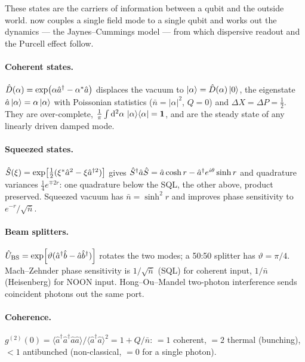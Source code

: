 These states are the carriers of information between a qubit and the
outside world.  now couples a single field
mode to a single qubit and works out the dynamics --- the
Jaynes--Cummings model --- from which dispersive readout and the
Purcell effect follow.

\clearpage
\begin{chaptersummary}

\paragraph{Coherent states.}
$\hat{D}(\alpha)=\exp(\alpha\hat a^\dagger-\alpha^*\hat a)$ displaces
the vacuum to $\ket\alpha=\hat{D}(\alpha)\ket0$, the eigenstate
$\hat a\ket\alpha=\alpha\ket\alpha$ with Poissonian statistics
($\bar n=|\alpha|^2$, $Q=0$) and $\Delta X=\Delta P=\tfrac12$. They
are over-complete, $\tfrac1\pi\int\dd^2\alpha\,\ket\alpha\!\bra\alpha=\mathbf{1}$,
and are the steady state of any linearly driven damped mode.

\paragraph{Squeezed states.}
$\hat{S}(\xi)=\exp[\tfrac12(\xi^*\hat a^2-\xi\hat a^{\dagger2})]$
gives $\hat{S}^\dagger\hat a\hat{S}=\hat a\cosh r-\hat a^\dagger e^{i\theta}\sinh r$
and quadrature variances $\tfrac14 e^{\mp2r}$: one quadrature below
the SQL, the other above, product preserved. Squeezed vacuum has
$\bar n=\sinh^2 r$ and improves phase sensitivity to
$e^{-r}/\sqrt{\bar n}$.

\paragraph{Beam splitters.}
$\hat{U}_{\rm BS}=\exp[\vartheta(\hat a^\dagger\hat b-\hat a\hat b^\dagger)]$
rotates the two modes; a 50:50 splitter has $\vartheta=\pi/4$.
Mach--Zehnder phase sensitivity is $1/\sqrt{\bar n}$ (SQL) for
coherent input, $1/\bar n$ (Heisenberg) for NOON input. Hong--Ou--Mandel
two-photon interference sends coincident photons out the same port.

\paragraph{Coherence.}
$g^{(2)}(0)=\langle\hat a^\dagger\hat a^\dagger\hat a\hat a\rangle/\langle\hat a^\dagger\hat a\rangle^2=1+Q/\bar n$:
$=1$ coherent, $=2$ thermal (bunching), $<1$ antibunched
(non-classical, $=0$ for a single photon).

\end{chaptersummary}

